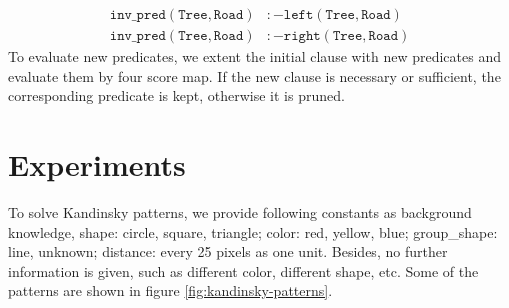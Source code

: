 \documentclass[
]{ceurart}
\begin{document}
\begin{align*}
	\mathtt{inv\_pred(Tree,Road)}&\mathtt{:-left(Tree,Road)} 	\\	
	\mathtt{inv\_pred(Tree,Road)}&\mathtt{:-right(Tree, Road)}
\end{align*}
To evaluate new predicates, we extent the initial clause with new predicates and evaluate them by four score map. If the new clause is necessary or  sufficient, the corresponding predicate is kept, otherwise it is pruned.





\section{Experiments}
To solve Kandinsky patterns, we provide following constants as background knowledge, 
shape: circle, square, triangle; color: red, yellow, blue; group\_shape: line, unknown; distance: every 25 pixels as one unit. Besides, no further information is given, such as different color, different shape, etc. Some of the patterns are shown in figure \ref{fig:kandinsky-patterns}.
\end{document}
